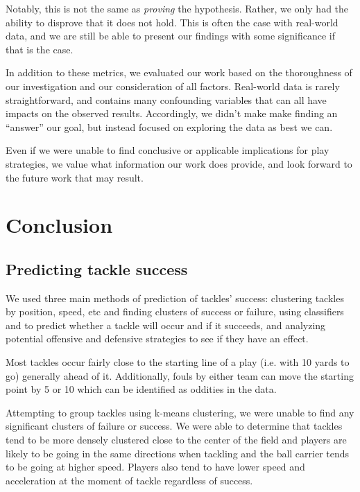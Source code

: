 \documentclass[bibtex, sigconf, hyperref={colorlinks=true,linkcolor=blue,urlcolor=blue}]{acmart}
\begin{document}
Notably, this is not the same as \textit{proving} the hypothesis. Rather, we
only had the ability to disprove that it does not hold. This is often the case
with real-world data, and we are still be able to present our findings with some
significance if that is the case.

In addition to these metrics, we evaluated our work based on the thoroughness of
our investigation and our consideration of all factors. Real-world data is
rarely straightforward, and contains many confounding variables that can all
have impacts on the observed results. Accordingly, we didn't make make finding
an “answer” our goal, but instead focused on exploring the data as best we can.

Even if we were unable to find conclusive or applicable implications for play strategies,
we value what information our work does provide, and look forward to the future work
that may result.

\section{Conclusion}

\subsection{Predicting tackle success}

We used three main methods of prediction of tackles' success:
clustering tackles by position, speed, etc and finding clusters of success or failure,
using classifiers and to predict whether a tackle will occur and if it succeeds,
and analyzing potential offensive and defensive strategies to see if they have an effect.

Most tackles occur fairly close to the starting line of a play (i.e. with 10 yards to go)
generally ahead of it. Additionally, fouls by either team can move the starting
point by 5 or 10 which can be identified as oddities in the data.

Attempting to group tackles using k-means clustering, we were unable to find
any significant clusters of failure or success. We were able to determine that
tackles tend to be more densely clustered close to the center of the field and
players are likely to be going in the same directions when tackling and the ball
carrier tends to be going at higher speed. Players also tend to have lower speed
and acceleration at the moment of tackle regardless of success.
\end{document}
